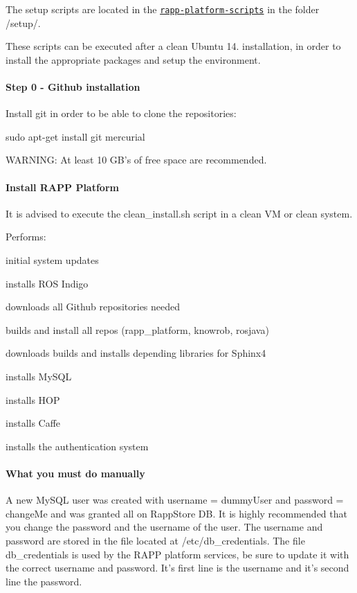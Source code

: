 The setup scripts are located in the \href{https://github.com/rapp-project/rapp-platform-scripts}{\tt rapp-\/platform-\/scripts} in the folder {\ttfamily /setup/}.

These scripts can be executed after a clean Ubuntu 14. installation, in order to install the appropriate packages and setup the environment.

\paragraph*{Step 0 -\/ Github installation}

Install git in order to be able to clone the repositories\-:

{\ttfamily sudo apt-\/get install git mercurial}

W\-A\-R\-N\-I\-N\-G\-: At least 10 G\-B's of free space are recommended.

\paragraph*{Install R\-A\-P\-P Platform}

It is advised to execute the clean\-\_\-install.\-sh script in a clean V\-M or clean system.

Performs\-:
\begin{DoxyItemize}
\item initial system updates
\item installs R\-O\-S Indigo
\item downloads all Github repositories needed
\item builds and install all repos (rapp\-\_\-platform, knowrob, rosjava)
\item downloads builds and installs depending libraries for Sphinx4
\item installs My\-S\-Q\-L
\item installs H\-O\-P
\item installs Caffe
\item installs the authentication system
\end{DoxyItemize}

\paragraph*{What you must do manually}

A new My\-S\-Q\-L user was created with username = {\ttfamily dummy\-User} and password = {\ttfamily change\-Me} and was granted all on Rapp\-Store D\-B. It is highly recommended that you change the password and the username of the user. The username and password are stored in the file located at /etc/db\-\_\-credentials. The file db\-\_\-credentials is used by the R\-A\-P\-P platform services, be sure to update it with the correct username and password. It's first line is the username and it's second line the password.

